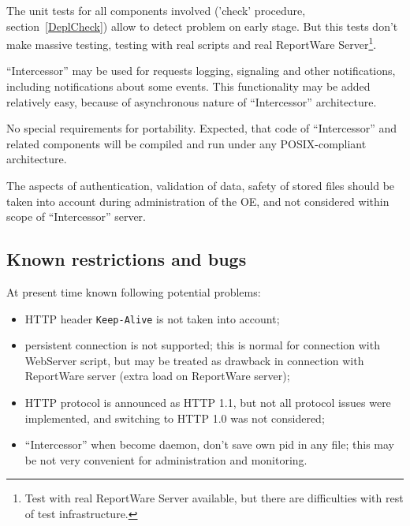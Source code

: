 \documentclass[a4paper,twoside]{article}
\newcommand{\Inter}{{\fontseries{b}\selectfont ``Intercessor''}}
\begin{document}
The unit tests for all components involved ('check' procedure, section~\ref{DeplCheck})
allow to detect problem on early stage. But this tests don't make massive testing,
testing with real scripts and real ReportWare Server\footnote{Test with real
ReportWare Server available, but there are difficulties with rest of test infrastructure.}.

\Inter{} may be used for requests logging, signaling and other notifications, including
notifications about some events. This functionality
may be added relatively easy, because of asynchronous nature of \Inter{} architecture.




No special requirements for portability. Expected, that code of \Inter{} and related
components will be compiled and run under any POSIX-compliant architecture.


The aspects of authentication, validation of data, safety of stored files should be taken into
account during administration of the OE, and not considered within scope of \Inter{} server.

\subsection{Known restrictions and bugs}

At present time known following potential problems:
\begin{itemize}
  \item HTTP header \verb|Keep-Alive| is not taken into account;
  \item persistent connection is not supported; this is normal for connection with
        WebServer script, but may be treated as drawback in connection with
        ReportWare server (extra load on ReportWare server);
  \item HTTP protocol is announced as HTTP 1.1, but not all protocol issues were implemented,
        and switching to HTTP 1.0 was not considered;
  \item \Inter{} when become daemon, don't save own pid in any file; this may be not very convenient
        for administration and monitoring.
\end{itemize}
\end{document}
